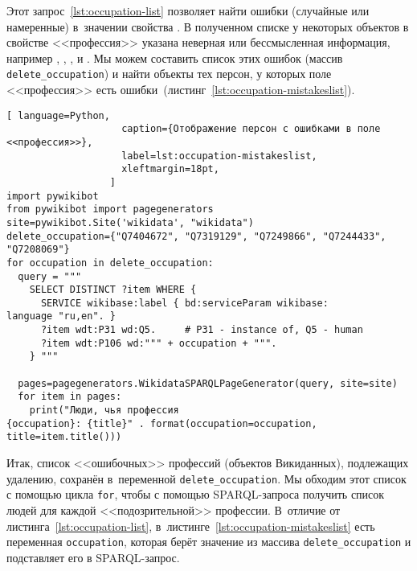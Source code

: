 Этот запрос~\ref{lst:occupation-list} позволяет найти ошибки 
(случайные или намеренные) в~значении свойства . 
В полученном списке у некоторых объектов в свойстве <<профессия>> 
указана неверная или бессмысленная информация, 
например 
, 
, 
, 
 и 
. 
Мы можем составить список этих ошибок (массив \lstinline|delete_occupation|)
и найти объекты тех персон, 
у которых поле <<профессия>> есть ошибки~(листинг~\ref{lst:occupation-mistakeslist}).




\newpage
\begin{lstlisting}[ language=Python,
                    caption={Отображение персон с ошибками в поле <<профессия>>},
                    label=lst:occupation-mistakeslist,
                    xleftmargin=18pt, 
                  ]
import pywikibot
from pywikibot import pagegenerators
site=pywikibot.Site('wikidata', "wikidata")
delete_occupation={"Q7404672", "Q7319129", "Q7249866", "Q7244433", 
"Q7208069"}
for occupation in delete_occupation:
  query = """
    SELECT DISTINCT ?item WHERE {
      SERVICE wikibase:label { bd:serviceParam wikibase:
language "ru,en". }
      ?item wdt:P31 wd:Q5.     # P31 - instance of, Q5 - human
      ?item wdt:P106 wd:""" + occupation + """.
    } """

  pages=pagegenerators.WikidataSPARQLPageGenerator(query, site=site)
  for item in pages:
    print("Люди, чья профессия 
{occupation}: {title}" . format(occupation=occupation, 
title=item.title()))
\end{lstlisting} 

Итак, список <<ошибочных>> профессий (объектов Викиданных), подлежащих удалению, сохранён в~переменной 
\lstinline|delete_occupation|. 
Мы обходим этот список с помощью цикла \lstinline|for|, 
чтобы с помощью SPARQL-запроса получить список людей для каждой <<подозрительной>> профессии. 
В~отличие от листинга~\ref{lst:occupation-list}, в~листинге~\ref{lst:occupation-mistakeslist} есть переменная \lstinline|occupation|, 
которая берёт значение из массива \lstinline|delete_occupation| и подставляет его в SPARQL-запрос.

